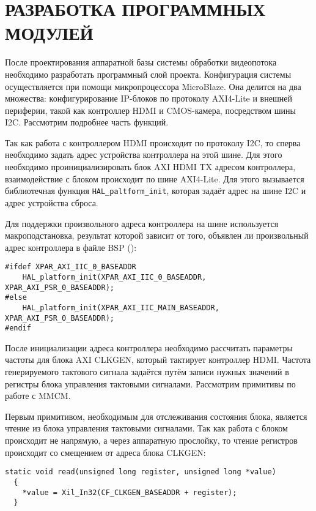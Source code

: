 \section{РАЗРАБОТКА ПРОГРАММНЫХ МОДУЛЕЙ}
\label{sec:software_modules}

После проектирования аппаратной базы системы обработки видеопотока
необходимо разработать программный слой проекта. Конфигурация системы
осуществляется при помощи микропроцессора MicroBlaze. Она делится
на два множества: конфигурирование IP-блоков по протоколу AXI4-Lite и
внешней периферии, такой как контроллер HDMI и CMOS-камера, посредством
шины I2C. Рассмотрим подробнее часть функций.


Так как работа с контроллером HDMI происходит по протоколу I2C, то
сперва необходимо задать адрес устройства контроллера на этой шине.
Для этого необходимо проинициализировать блок AXI HDMI TX адресом контроллера,
взаимодействие с блоком происходит по шине AXI4-Lite.
Для этого вызывается библиотечная функция \texttt{HAL\_paltform\_init}, которая
задаёт адрес на шине I2C и адрес устройства сброса.

Для поддержки произвольного адреса контроллера на шине используется макроподстановка,
результат которой зависит от того, объявлен ли произвольный адрес контроллера в файле
BSP ():
\medskip
\begin{lstlisting}[style=C]
#ifdef XPAR_AXI_IIC_0_BASEADDR
	HAL_platform_init(XPAR_AXI_IIC_0_BASEADDR, XPAR_AXI_PSR_0_BASEADDR);
#else
  	HAL_platform_init(XPAR_AXI_IIC_MAIN_BASEADDR, XPAR_AXI_PSR_0_BASEADDR);
#endif
\end{lstlisting}
\medskip

После инициализации адреса контроллера необходимо рассчитать параметры
частоты для блока AXI CLKGEN, который тактирует контроллер HDMI.
Частота генерируемого тактового сигнала задаётся путём записи нужных
значений в регистры блока управления тактовыми сигналами. Рассмотрим
примитивы по работе с MMCM.

Первым примитивом, необходимым для отслеживания состояния блока, является
чтение из блока управления тактовыми сигналами. Так как работа с блоком происходит
не напрямую, а через аппаратную прослойку, то чтение регистров происходит со смещением
от адреса блока CLKGEN:
\medskip
\begin{lstlisting}[style=C]
  static void read(unsigned long register, unsigned long *value)
  {
	*value = Xil_In32(CF_CLKGEN_BASEADDR + register);
  }
\end{lstlisting}
\medskip

